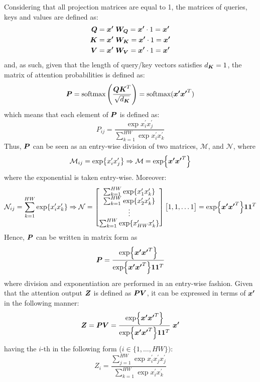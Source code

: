 \begin{questions}
\begin{parts}
        \end{parts}
        \question %
        Considering that all projection matrices are equal to 1, the matrices of queries, keys and values are defined as:
        \begin{align*}
            \vb*{Q} &= \vb*{x^{\prime}} \; \vb*{W_Q}  = \vb*{x^{\prime}} \cdot 1 = \vb*{x^{\prime}} \\
            \vb*{K} &= \vb*{x^{\prime}} \; \vb*{W_K} = \vb*{x^{\prime}} \cdot 1 = \vb*{x^{\prime}}\\
            \vb*{V} &= \vb*{x^{\prime}} \; \vb*{W_V} = \vb*{x^{\prime}} \cdot 1 = \vb*{x^{\prime}} 
        \end{align*}
        and, as such, given that the length of query/key vectors satisfies $d_{\vb*{K}} = 1$, the matrix of attention probabilities is defined as:
        \[
        \vb*{P} = \text{softmax}\left(\frac{\vb*{Q}\vb*{K}^T}{\sqrt{d_{\vb*{K}}}}\right) = \text{softmax}(\vb*{x^{\prime}}\vb*{x^{\prime}}^T)
        \]
        which means that each element of $\vb*{P}$ is defined as:
        \[
        P_{ij} = \frac{\exp{x^{\prime}_i x^{\prime}_j}}{\sum_{k = 1}^{HW}\exp{x^{\prime}_i x^{\prime}_k}}
        \]
        Thus, $\vb*{P}$ can be seen as an entry-wise division of two matrices, $\mathcal{M}$, and $\mathcal{N}$, where
        \[
        \mathcal{M}_{ij} = \exp{x^{\prime}_i x^{\prime}_j} \Rightarrow \mathcal{M} = \exp{\vb*{x^{\prime}}\vb*{x^{\prime}}^T}
        \]
        where the exponential is taken entry-wise. Moreover:
        \[
        \mathcal{N}_{ij} =\sum_{k = 1}^{HW}\exp{x^{\prime}_i x^{\prime}_k }\Rightarrow \mathcal{N} = 
        \begin{bmatrix}
            \sum_{k = 1}^{HW}\exp{x^{\prime}_1 x^{\prime}_k} \\
            \sum_{k = 1}^{HW}\exp{x^{\prime}_2 x^{\prime}_k} \\
            \vdots \\
            \sum_{k = 1}^{HW}\exp{x^{\prime}_{HW} x^{\prime}_k}
        \end{bmatrix}
        \begin{bmatrix}
            1, 1, \dots 1
        \end{bmatrix} = 
        \exp{\vb*{x^{\prime}}\vb*{x^{\prime}}^T} \mathbf{1} \mathbf{1}^T
        \]
        Hence, $\vb*{P}$ can be written in matrix form as
        \[
        \vb*{P} = \frac{\exp{\vb*{x^{\prime}}\vb*{x^{\prime}}^T}}{ \exp{\vb*{x^{\prime}}\vb*{x^{\prime}}^T} \mathbf{1} \mathbf{1}^T}
        \]
        where division and exponentiation are performed in an entry-wise fashion.
        Given that the attention output $\vb*{Z}$ is defined as $\vb*{PV}$, it can be expressed in terms of $\vb*{x^{\prime}}$ in the following manner:
        \[
        \vb*{Z} = \vb*{PV} = \frac{\exp{\vb*{x^{\prime}}\vb*{x^{\prime}}^T}}{ \exp{\vb*{x^{\prime}}\vb*{x^{\prime}}^T} \mathbf{1} \mathbf{1}^T} \; \vb*{x^{\prime}}
        \]
        having the $i$-th in the following form ($i \in \{1, \dots, HW\})$:
        \[
         Z_{i} = \frac{\sum_{j = 1}^{HW}\exp{x^{\prime}_i x^{\prime}_j} x^{\prime}_j}{\sum_{k = 1}^{HW}\exp{x^{\prime}_i x^{\prime}_k}}
        \]
                  

\end{questions}

